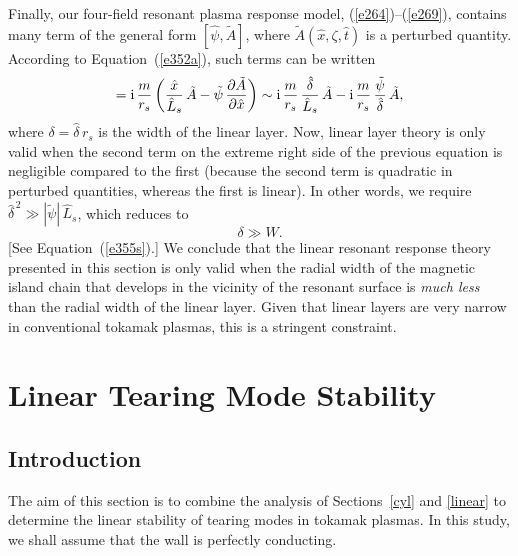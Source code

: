 \documentclass[notitlepage,12pt]{article}
\begin{document}
Finally, our four-field resonant plasma response model, (\ref{e264})--(\ref{e269}), contains many term of the general form $[\hat{\psi},\tilde{A}]$,
where $\tilde{A}(\hat{x},\zeta,\hat{t})$ is a perturbed quantity. According to Equation~(\ref{e352a}), such terms
can be written
\begin{equation}
[\hat{\psi},\tilde{A}] = {\rm i}\,\frac{m}{r_s}\left(\frac{\hat{x}}{\hat{L}_s}\,\tilde{A} - \tilde{\psi}\,\frac{\partial \tilde{A}}{\partial\hat{x}}\right)
\sim {\rm i}\,\frac{m}{r_s}\,\frac{\hat{\delta}}{\hat{L}_s}\,\tilde{A} - {\rm i}\,\frac{m}{r_s}\,\frac{\tilde{\psi}}{\hat{\delta}}\,\tilde{A}, 
\end{equation}
where $\delta = \hat{\delta}\,r_s$ is the width of the linear layer. Now, linear layer theory is only valid when the second
term on the extreme right side of the previous equation is negligible compared to the first (because the second term is quadratic in perturbed quantities, whereas the first is linear). In other words,
we require $\hat{\delta}^{\,2}\gg |\tilde{\psi}|\,\hat{L}_s$, which reduces to 
\begin{equation}
\delta \gg W.
\end{equation}
[See Equation~(\ref{e355s}).]
We conclude that the linear resonant response theory presented in this section is only valid when the radial width of the magnetic
island chain that develops in the vicinity of the resonant surface is {\em much less}\/ than the radial width of the linear layer. 
Given that linear layers are very narrow in conventional tokamak plasmas, this is a stringent constraint. 

\section{Linear Tearing Mode Stability}
\subsection{Introduction}
The aim of this section is to combine the analysis of Sections~\ref{cyl} and \ref{linear} to determine the linear stability
of tearing modes in tokamak plasmas. In this study, we shall assume that the wall is perfectly conducting. 
\end{document}
